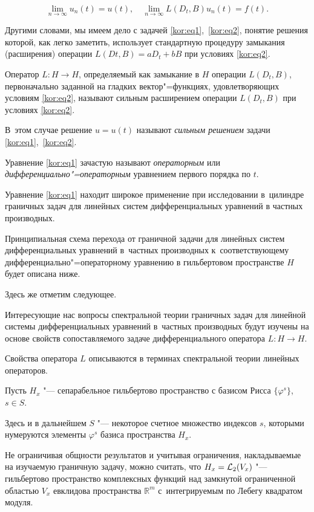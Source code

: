 $$\lim\limits_{n\to\infty}u_n(t)=u(t),\quad \lim\limits_{n\to\infty}L(D_t,B)u_n(t)=f(t).$$ 

Другими словами, мы имеем дело с задачей \eqref{kor:eq1},~\eqref{kor:eq2}, понятие решения которой, как легко заметить, использует стандартную процедуру замыкания (расширения) операции $L(Dt, B)=aD_t+bB$ при условиях \eqref{kor:eq2}. 

Оператор $L:H\to H$, определяемый как замыкание в $H$ операции $L(D_t,B)$, первоначально заданной на гладких вектор"=функциях, удовлетворяющих условиям \eqref{kor:eq2}, называют сильным расширением операции $L(D_t ,B)$ при условиях \eqref{kor:eq2}. 

В~этом случае решение $u=u(t)$ называют \textit{сильным решением} задачи \eqref{kor:eq1},~\eqref{kor:eq2}. 

Уравнение \eqref{kor:eq1} зачастую называют \textit{операторным} или \textit{дифференциально"=операторным} уравнением первого порядка по $t$. 

Уравнение \eqref{kor:eq1} находит широкое применение при исследовании в~цилиндре граничных задач для линейных систем дифференциальных уравнений в частных производных. 



Принципиальная схема перехода от граничной задачи для линейных систем дифференциальных уравнений в~частных производных к~соответствующему дифференциально"=операторному уравнению в гильбертовом пространстве $H$ будет описана ниже. 

Здесь же отметим следующее. 

Интересующие нас вопросы спектральной теории граничных задач для линейной системы дифференциальных уравнений в~частных производных будут изучены на основе свойств сопоставляемого задаче дифференциального оператора $L:H\to H$. 

Свойства оператора $L$ описываются в терминах спектральной теории линейных операторов.



\smallskip




Пусть $H_x$ "--- сепарабельное гильбертово пространство с базисом Рисса $\{\varphi^s\}$, $s\in S$. 

Здесь и в дальнейшем $S$ "--- некоторое счетное множество индексов $s$, которыми нумеруются элементы $\varphi^s$ базиса пространства $H_x$. 

Не ограничивая общности результатов и учитывая ограничения, накладываемые на изучаемую граничную задачу, можно считать, что $H_x={\cal L}_2(V_x)$ "--- гильбертово пространство комплексных функций над замкнутой ограниченной областью $V_x$ евклидова пространства $\mathbb R^m$ с~интегрируемым по Лебегу квадратом модуля. 

